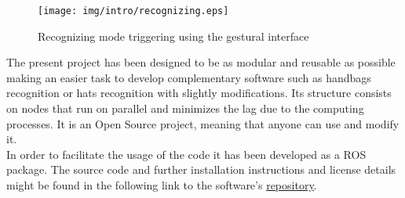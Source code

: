\vspace*{0.5cm}
\begin{figure}[H]
	\centering
    \texttt{[image: img/intro/recognizing.eps]}
	\caption[Recognizing Mode Triggering]{Recognizing mode triggering using the gestural interface}
\end{figure}

\vspace*{0.5cm}

The present project has been designed to be as modular and reusable as possible making an easier task to develop complementary software such as handbags recognition or hats recognition with slightly modifications. Its structure consists on nodes that run on parallel and minimizes the lag due to the computing processes. It is an Open Source project, meaning that anyone can use and modify it.
\\

In order to facilitate the usage of the code it has been developed as a ROS \cite{ros} package. The source code and further installation instructions and license details might be found in the following link to the software's \href{http://github.com/irenesanznieto/ocular}{\color{blue}\underline {repository}}. 
